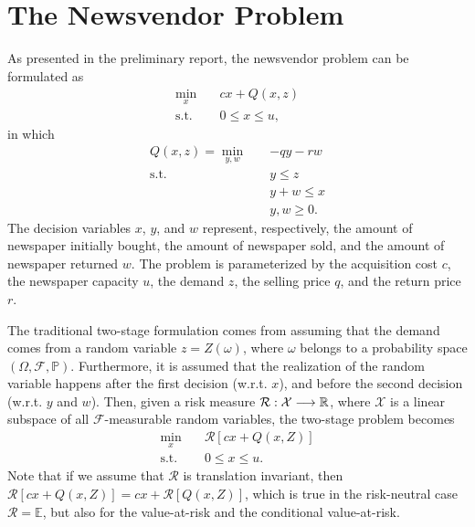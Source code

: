 \documentclass[12pt]{article}
\begin{document}
\section*{The Newsvendor Problem}

As presented in the preliminary report, the newsvendor problem can be formulated as 
\begin{equation}\label{eq:deterministic-2sp-ul}
\begin{split}
    \min_{x} \quad & c x + Q(x,z) \\
    \textrm{s.t.} \quad & 0\le x\le u
,\end{split}
\end{equation}
in which 
\begin{equation}\label{eq:deterministic-2sp-ll}
\begin{split}
    Q(x,z) = \min_{y,w} \quad & -q y - r w \\
    \textrm{s.t.} \quad & y\le z \\
      & y+w \le x \\
      & y,w \ge 0
.\end{split}
\end{equation}
The decision variables $x$, $y$, and $w$ represent, respectively, the amount of newspaper initially bought, the amount of newspaper sold, and the amount of newspaper returned $w$.
The problem is parameterized by the acquisition cost $c$, the newspaper capacity $u$, the demand $z$, the selling price $q$, and the return price $r$.

The traditional two-stage formulation comes from assuming that the demand comes from a random variable $z=Z(\omega)$, where  $\omega$ belongs to a probability space $(\Omega, \mathcal{F},\mathbb{P})$.
Furthermore, it is assumed that the realization of the random variable happens after the first decision (w.r.t. $x$), and before the second decision (w.r.t. $y$ and $w$).
Then, given a risk measure $\mathcal{R}: \mathcal{X} \longrightarrow \mathbb{R}$, where $\mathcal{X}$ is a linear subspace of all $\mathcal{F}$-measurable random variables, the two-stage problem becomes
\begin{equation}\label{eq:two-stage}
\begin{split}
    \min_{x} \quad & \mathcal{R}[c x + Q(x,Z)] \\
    \textrm{s.t.} \quad & 0\le x\le u
.\end{split}
\end{equation}
Note that if we assume that $\mathcal{R}$ is translation invariant, then $\mathcal{R}[c x + Q(x,Z)] = cx + \mathcal{R}[Q(x,Z)]$, which is true in the risk-neutral case $\mathcal{R} = \mathbb{E}$, but also for the value-at-risk and the conditional value-at-risk.
\end{document}
